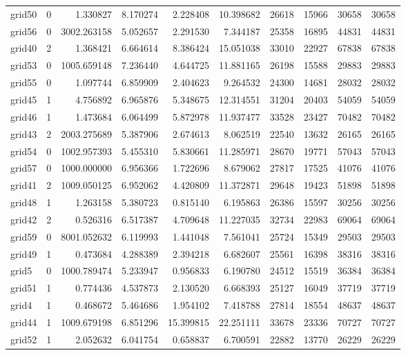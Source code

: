 \begin{longtable}{|l|r|r|r|r|r|r|r|r|r|}
grid50 & 0 & 1.330827 & 8.170274 & 2.228408 & 10.398682 & 26618 & 15966 & 30658 & 30658 \\
grid56 & 0 & 3002.263158 & 5.052657 & 2.291530 & 7.344187 & 25358 & 16895 & 44831 & 44831 \\
grid40 & 2 & 1.368421 & 6.664614 & 8.386424 & 15.051038 & 33010 & 22927 & 67838 & 67838 \\
grid53 & 0 & 1005.659148 & 7.236440 & 4.644725 & 11.881165 & 26198 & 15588 & 29883 & 29883 \\
grid55 & 0 & 1.097744 & 6.859909 & 2.404623 & 9.264532 & 24300 & 14681 & 28032 & 28032 \\
grid45 & 1 & 4.756892 & 6.965876 & 5.348675 & 12.314551 & 31204 & 20403 & 54059 & 54059 \\
grid46 & 1 & 1.473684 & 6.064499 & 5.872978 & 11.937477 & 33528 & 23427 & 70482 & 70482 \\
grid43 & 2 & 2003.275689 & 5.387906 & 2.674613 & 8.062519 & 22540 & 13632 & 26165 & 26165 \\
grid54 & 0 & 1002.957393 & 5.455310 & 5.830661 & 11.285971 & 28670 & 19771 & 57043 & 57043 \\
grid57 & 0 & 1000.000000 & 6.956366 & 1.722696 & 8.679062 & 27817 & 17525 & 41076 & 41076 \\
grid41 & 2 & 1009.050125 & 6.952062 & 4.420809 & 11.372871 & 29648 & 19423 & 51898 & 51898 \\
grid48 & 1 & 1.263158 & 5.380723 & 0.815140 & 6.195863 & 26386 & 15597 & 30256 & 30256 \\
grid42 & 2 & 0.526316 & 6.517387 & 4.709648 & 11.227035 & 32734 & 22983 & 69064 & 69064 \\
grid59 & 0 & 8001.052632 & 6.119993 & 1.441048 & 7.561041 & 25724 & 15349 & 29503 & 29503 \\
grid49 & 1 & 0.473684 & 4.288389 & 2.394218 & 6.682607 & 25561 & 16398 & 38316 & 38316 \\
grid5 & 0 & 1000.789474 & 5.233947 & 0.956833 & 6.190780 & 24512 & 15519 & 36384 & 36384 \\
grid51 & 1 & 0.774436 & 4.537873 & 2.130520 & 6.668393 & 25127 & 16049 & 37719 & 37719 \\
grid4 & 1 & 0.468672 & 5.464686 & 1.954102 & 7.418788 & 27814 & 18554 & 48637 & 48637 \\
grid44 & 1 & 1009.679198 & 6.851296 & 15.399815 & 22.251111 & 33678 & 23336 & 70727 & 70727 \\
grid52 & 1 & 2.052632 & 6.041754 & 0.658837 & 6.700591 & 22882 & 13770 & 26229 & 26229 \\

\end{longtable}
